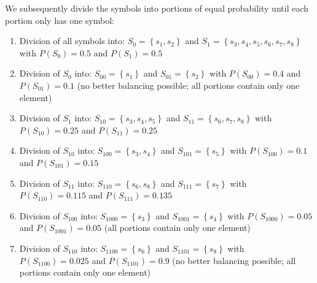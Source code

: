 \begin{solution}
	\begin{tasks}
		\task
		We subsequently divide the symbols into portions of equal probability until each portion only has one symbol:
		\begin{enumerate}
			\item
			Division of all symbols into: $S_{0} = \left\{s_1, s_2\right\}$ and $S_{1} = \left\{s_3, s_4, s_5, s_6, s_7, s_8\right\}$ with $P\left(S_{0}\right) = 0.5$ and $P\left(S_{1}\right) = 0.5$
			\item
			Division of $S_{0}$ into: $S_{00} = \left\{s_1\right\}$ and $S_{01} = \left\{s_2\right\}$ with $P\left(S_{00}\right) = 0.4$ and $P\left(S_{01}\right) = 0.1$ (no better balancing possible; all portions contain only one element)
			\item
			Division of $S_{1}$ into: $S_{10} = \left\{s_3, s_4, s_5\right\}$ and $S_{11} = \left\{s_6, s_7, s_8\right\}$ with $P\left(S_{10}\right) = 0.25$ and $P\left(S_{11}\right) = 0.25$
			\item
			Division of $S_{10}$ into: $S_{100} = \left\{s_3, s_4\right\}$ and $S_{101} = \left\{s_5\right\}$ with $P\left(S_{100}\right) = 0.1$ and $P\left(S_{101}\right) = 0.15$
			\item
			Division of $S_{11}$ into: $S_{110} = \left\{s_6, s_8\right\}$ and $S_{111} = \left\{s_7\right\}$ with $P\left(S_{110}\right) = 0.115$ and $P\left(S_{111}\right) = 0.135$
			\item
			Division of $S_{100}$ into: $S_{1000} = \left\{s_3\right\}$ and $S_{1001} = \left\{s_4\right\}$ with $P\left(S_{1000}\right) = 0.05$ and $P\left(S_{1001}\right) = 0.05$ (all portions contain only one element)
			\item
			Division of $S_{110}$ into: $S_{1100} = \left\{s_6\right\}$ and $S_{1101} = \left\{s_8\right\}$ with $P\left(S_{1100}\right) = 0.025$ and $P\left(S_{1101}\right) = 0.9$ (no better balancing possible; all portions contain only one element)
		\end{enumerate}
	

\end{tasks}
\end{solution}
